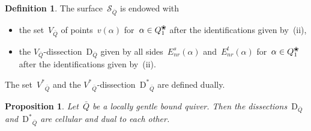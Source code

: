 \documentclass{amsart}
\newtheorem{proposition}[theorem]{Proposition}
\theoremstyle{definition}
\newtheorem{definition}[theorem]{Definition}
\newcommand{\blossom}{^\text{\ding{96}}} %
\newcommand{\Enrs}[1]{E_{nr}^{s}(#1)}
\newcommand{\Enrt}[1]{E_{nr}^{t}(#1)}
\newcommand{\surface}{\mathcal{S}} %
\newcommand{\dual}{^*} %
\newcommand{\dissection}{\mathrm{D}} %
\begin{document}
\begin{definition}
\label{def:dissectionQuiver}
The surface~$\surface_{\bar Q}$ is endowed with
\begin{itemize}
\item the set~$V_{\bar Q}$ of points~$v(\alpha)$ for~$\alpha \in Q_1\blossom$ after the identifications given by~(ii),
\item the $V_{\bar Q}$-dissection~$\dissection_{\bar Q}$ given by all sides~$\Enrs{\alpha}$ and~$\Enrt{\alpha}$ for~$\alpha \in Q_1\blossom$ after the identifications given by~(ii).
\end{itemize}
The set~${{V\dual}\!\!_{\bar Q}}$ and the ${{V\dual}\!\!_{\bar Q}}$-dissection~${\dissection\dual\!\!_{\bar Q}}$ are defined dually.
\end{definition}

\begin{proposition}
\label{prop:dissectionsAreCellular}
Let~$\bar Q$ be a locally gentle bound quiver.
Then the dissections~$\dissection_{\bar Q}$ and~$\dissection\dual\!\!_{\bar Q}$ are cellular and dual to each other.
\end{proposition}
\end{document}
